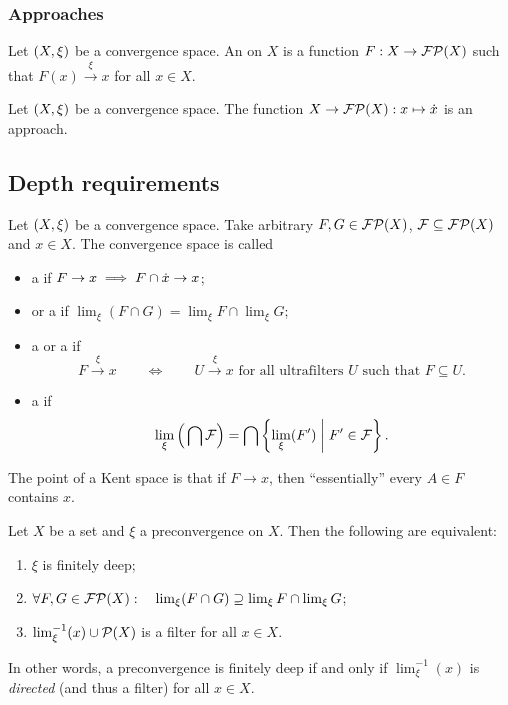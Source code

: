 \subsubsection{Approaches}
\begin{definition}
Let $\left( X,\xi \right)$ be a convergence space. An  on $X$ is a function $F: X\to \operatorname{\mathcal{FP}}(X)$ such that $F(x) \overset{\xi}{\longrightarrow} x$ for all $x\in X$.
\end{definition}

\begin{lemma}
Let $\left( X,\xi \right)$ be a convergence space. The function $X\to \operatorname{\mathcal{FP}}(X): x\mapsto \dot{x}$ is an approach.
\end{lemma}

\subsection{Depth requirements}
\begin{definition}
Let $\left( X,\xi \right)$ be a convergence space. Take arbitrary $F,G \in \operatorname{\mathcal{FP}}(X)$, $\mathcal{F}\subseteq \operatorname{\mathcal{FP}}(X)$ and $x\in X$. The convergence space is called
\begin{itemize}
\item a  if $F \to x \implies F\cap \dot{x} \to x$;
\item {} or a  if $\lim_\xi(F\cap G) = \lim_\xi F \cap \lim_\xi G$;
\item a  or a  if
\[ F\overset{\xi}{\longrightarrow} x \qquad\iff\qquad \text{$U\overset{\xi}{\longrightarrow} x$ for all ultrafilters $U$ such that $F\subseteq U$.} \]
\item a  if 
\[ \lim_\xi\Big(\bigcap \mathcal{F}\Big) = \bigcap \left\{ \lim_\xi(F') \;\middle|\; F'\in \mathcal{F} \right\}. \]
\end{itemize}
\end{definition}

The point of a Kent space is that if $F\to x$, then ``essentially'' every $A\in F$ contains $x$.

\begin{lemma} \label{finiteDepthLemma}
Let $X$ be a set and $\xi$ a preconvergence on $X$. Then the following are equivalent:
\begin{enumerate}
\item $\xi$ is finitely deep;
\item $\forall F,G \in \operatorname{\mathcal{FP}}(X): \quad \lim_\xi(F\cap G) \supseteq \lim_\xi F \cap \lim_\xi G$;
\item $\lim_\xi^{-1}(x)\cup \operatorname{\mathcal{P}}(X)$ is a filter for all $x\in X$.
\end{enumerate}
\end{lemma}
In other words, a preconvergence is finitely deep \textup{if and only if} $\lim_\xi^{-1}(x)$ is \emph{directed} (and thus a filter) for all $x\in X$.


